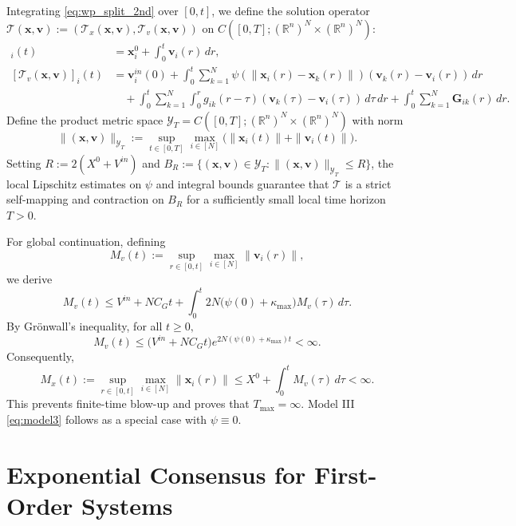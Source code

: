 \documentclass[11pt]{amsart}
\numberwithin{equation}{section}
\begin{document}
Integrating \eqref{eq:wp_split_2nd} over $[0,t]$, we define the solution operator $\mathcal{T}(\boldsymbol{x},\boldsymbol{v}) := (\mathcal{T}_x(\boldsymbol{x},\boldsymbol{v}), \mathcal{T}_v(\boldsymbol{x},\boldsymbol{v}))$ on $C([0,T];(\mathbb{R}^n)^N \times (\mathbb{R}^n)^N)$:
\begin{align*}
[\mathcal{T}_x(\boldsymbol{x},\boldsymbol{v})]_i(t) &= \boldsymbol{x}^0_i + \int_0^t \boldsymbol{v}_i(r)\,dr, \\
[\mathcal{T}_v(\boldsymbol{x},\boldsymbol{v})]_i(t) &= \boldsymbol{v}^{in}_i(0) + \int_0^t \sum_{k=1}^N \psi(\|\boldsymbol{x}_i(r)-\boldsymbol{x}_k(r)\|)(\boldsymbol{v}_k(r)-\boldsymbol{v}_i(r)) \, dr \\
&\quad + \int_0^t \sum_{k=1}^N \int_0^r g_{ik}(r-\tau)(\boldsymbol{v}_k(\tau)-\boldsymbol{v}_i(\tau)) \, d\tau\, dr + \int_0^t \sum_{k=1}^N \boldsymbol{G}_{ik}(r) \, dr.
\end{align*}
Define the product metric space $\mathcal{Y}_T = C([0,T];(\mathbb{R}^n)^N \times (\mathbb{R}^n)^N)$ with norm
$$
\|(\boldsymbol{x},\boldsymbol{v})\|_{\mathcal{Y}_T} := \sup_{t\in[0,T]}\max_{i\in[N]} \big( \|\boldsymbol{x}_i(t)\| + \|\boldsymbol{v}_i(t)\| \big).
$$
Setting $R := 2(X^0 + V^{in})$ and $B_R := \{(\boldsymbol{x},\boldsymbol{v}) \in \mathcal{Y}_T : \|(\boldsymbol{x},\boldsymbol{v})\|_{\mathcal{Y}_T} \le R\}$, the local Lipschitz estimates on $\psi$ and integral bounds guarantee that $\mathcal{T}$ is a strict self-mapping and contraction on $B_R$ for a sufficiently small local time horizon $T > 0$.

For global continuation, defining
$$
M_v(t) := \sup_{r\in[0,t]}\max_{i\in[N]}\|\boldsymbol{v}_i(r)\|,
$$
we derive
\begin{equation*}
M_v(t) \le V^{in} + N C_G t + \int_0^t 2 N \big(\psi(0)+\kappa_{\max}\big) M_v(\tau)\,d\tau.
\end{equation*}
By Gr\"onwall's inequality,  for all $t \ge 0,$
$$
M_v(t) \le \big(V^{in} + N C_G t\big) e^{2 N (\psi(0)+\kappa_{\max}) t} < \infty.
$$
Consequently,
$$
M_x(t) := \sup_{r\in[0,t]}\max_{i\in[N]}\|\boldsymbol{x}_i(r)\| \le X^0 + \int_0^t M_v(\tau)\,d\tau < \infty.
$$
This prevents finite-time blow-up and proves that $T_{\max} = \infty$. Model III \eqref{eq:model3} follows as a special case with $\psi \equiv 0$.


\section{Exponential Consensus for First-Order Systems}\label{sec:proof_1st}
\end{document}
